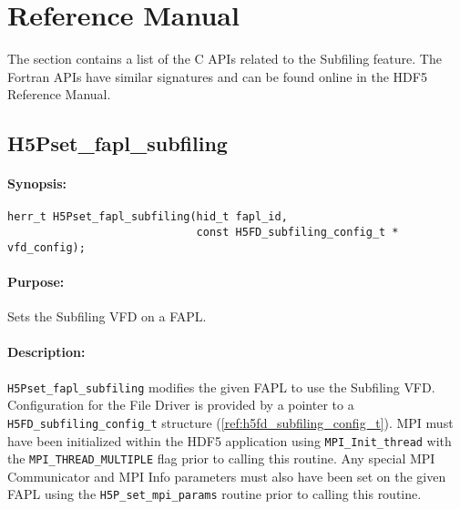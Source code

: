 \documentclass[../main.tex]{subfiles}
\begin{document}
\section{Reference Manual}

The section contains a list of the C APIs related to the Subfiling feature. The Fortran APIs have similar signatures and can be found online in the HDF5 Reference Manual.

\label{apdx:ref_manual}

\subsection{H5Pset\_fapl\_subfiling}
\label{ref:h5p_set_fapl_subfiling}

\paragraph{Synopsis:}
\begin{flushleft}%
\begin{verbatim}
herr_t H5Pset_fapl_subfiling(hid_t fapl_id,
                             const H5FD_subfiling_config_t * vfd_config);
\end{verbatim}
\end{flushleft}%

\paragraph{Purpose:}
\begin{flushleft}%
Sets the Subfiling \Gls{VFD} on a \Gls{FAPL}.
\end{flushleft}%

\paragraph{Description:}
\begin{flushleft}%
\texttt{H5Pset\_fapl\_subfiling} modifies the given \Gls{FAPL} to use the
Subfiling \Gls{VFD}. Configuration for the File Driver is provided by a
pointer to a \texttt{H5FD\_subfiling\_config\_t} structure (\ref{ref:h5fd_subfiling_config_t}).
MPI must have been initialized within the HDF5 application using \texttt{MPI\_Init\_thread}
with the \texttt{MPI\_THREAD\_MULTIPLE} flag prior to calling this routine. Any
special MPI Communicator and MPI Info parameters must also have been set on
the given FAPL using the \texttt{H5P\_set\_mpi\_params} routine prior to calling
this routine.
\end{flushleft}%
\end{document}
